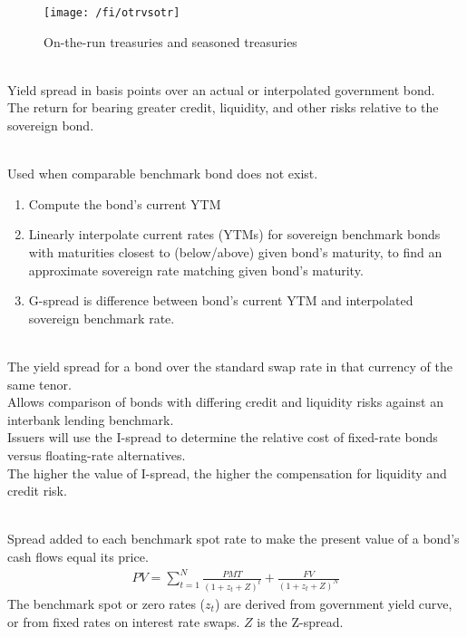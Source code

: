 \begin{figure}[H]
\centering
\texttt{[image: /fi/otrvsotr]}
\caption{On-the-run treasuries and seasoned treasuries}
\end{figure}

\begin{definition} \\
Yield spread in basis points over an actual or interpolated government bond.\\
The return for bearing greater credit, liquidity, and other risks relative to the sovereign bond.
\end{definition}

\begin{method} \\
Used when comparable benchmark bond does not exist.
\begin{enumerate}[label=\roman*.]
\setlength{\itemsep}{0pt}
\item Compute the bond's current YTM
\item Linearly interpolate current rates (YTMs) for sovereign benchmark bonds with maturities closest to (below/above) given bond’s maturity, to find an approximate sovereign rate matching given bond’s maturity.
\item G-spread is difference between bond’s current YTM and interpolated sovereign benchmark rate.
\end{enumerate}
\end{method}

\begin{definition}
\label{def:ispread}
\\
The yield spread for a bond over the standard swap rate in that currency of the same tenor.\\
Allows comparison of bonds with differing credit and liquidity risks against an interbank lending benchmark.\\
Issuers will use the I-spread to determine the relative cost of fixed-rate bonds versus floating-rate alternatives.\\
The higher the value of I-spread, the higher the compensation for liquidity and credit risk.
\end{definition}

\begin{definition} 
\label{def:zspread}
\\
Spread added to each benchmark spot rate to make the present value of a bond’s cash flows equal its price.
\begin{align}
PV = \sum\limits_{t=1}^N \frac{PMT}{(1 + z_t + Z)^t} + \frac{FV}{(1 + z_t + Z)^N} \nonumber
\end{align}
The benchmark spot or zero rates ($z_t$) are derived from government yield curve, or from fixed rates on interest rate swaps. $Z$ is the Z-spread.
\end{definition}

